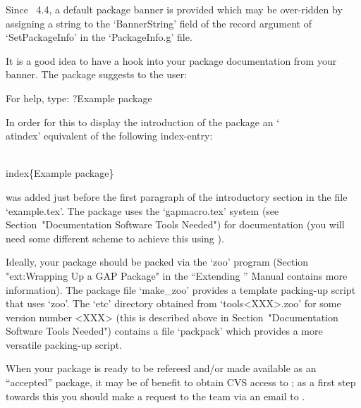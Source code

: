 Since {\GAP}~4.4, a default package  banner  is  provided  which  may  be
over-ridden by assigning a string to  the  `BannerString'  field  of  the
record argument of `SetPackageInfo' in the `PackageInfo.g' file.

It is a good idea to have a hook into  your  package  documentation  from
your banner. The {\Example} package suggests to the {\GAP} user:

\begintt
For help, type: ?Example package
\endtt

In order for this to display the introduction of the  {\Example}  package
an `\\atindex' equivalent of the following index-entry:

\)\\index\{Example package\}

was added just before the first paragraph of the introductory section  in
the file `example.tex'. The {\Example} package  uses  the  `gapmacro.tex'
system  (see   Section~"Documentation   Software   Tools   Needed")   for
documentation (you will need some different scheme to achieve this  using
).


Ideally, your {\GAP} package should  be  packed  via  the  `zoo'  program
(Section "ext:Wrapping Up a GAP  Package"  in  the  ``Extending  {\GAP}''
Manual contains more information). The {\Example} package file `make_zoo'
provides  a  template  packing-up  script  that  uses  `zoo'.  The  `etc'
directory obtained from `tools<XXX>.zoo' for some  version  number  <XXX>
(this  is  described  above  in  Section~"Documentation  Software   Tools
Needed") contains a file  `packpack'  which  provides  a  more  versatile
packing-up script.


When your package is ready to be refereed and/or  made  available  as  an
``accepted'' {\GAP} package, it may be of benefit to obtain CVS access to
{\GAP}; as a first step towards this you should make  a  request  to  the
{\GAP} team via an email to .

